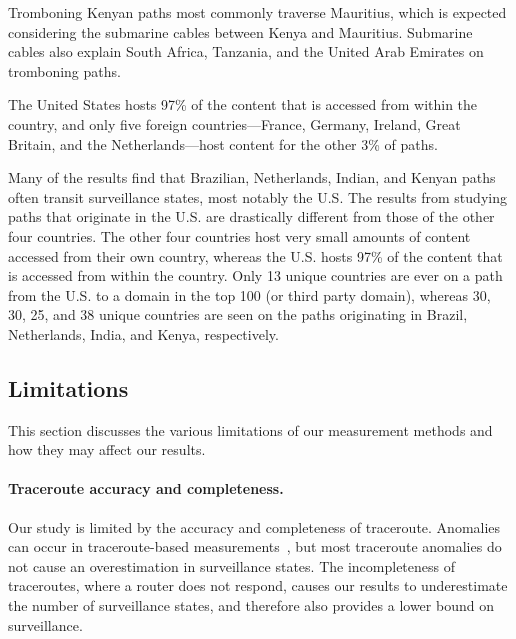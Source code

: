 Tromboning Kenyan paths most commonly traverse Mauritius, which is expected considering the submarine cables between Kenya and Mauritius.  Submarine cables also explain South Africa, Tanzania, and the United Arab Emirates on tromboning paths.  

\begin{finding}
The United States hosts 97\% of the content that is accessed from within the country, and only five foreign countries---France, Germany, Ireland, Great Britain, and the Netherlands---host content for the other 3\% of paths.
\end{finding}
\noindent
Many of the results find that Brazilian,
Netherlands, Indian, and Kenyan paths often transit surveillance states,
most notably the U.S.  The results from studying paths that
originate in the U.S. are drastically different from those of
the other four countries.  The other four countries host very small
amounts of content accessed from their own country, whereas the U.S.
hosts 97\% of the content that is accessed from within the
country.  Only 13 unique countries are ever on a path from the U.S.
to a domain in the top 100 (or third party domain), whereas 30,
30, 25, and 38 unique countries are seen on the paths originating in
Brazil, Netherlands, India, and Kenya, respectively.   


\subsection{Limitations}

This section discusses the various limitations of our measurement methods
and how they may affect our results.

\paragraph{Traceroute accuracy and completeness.}
Our study is limited by the accuracy and completeness of traceroute.
Anomalies can occur in traceroute-based
measurements~\cite{augustin2006avoiding}, but most traceroute anomalies
do not cause an overestimation in surveillance states.  The
incompleteness of traceroutes, where a router does not respond, causes
our results to underestimate the number of surveillance states, and
therefore also provides a lower bound on surveillance. 

